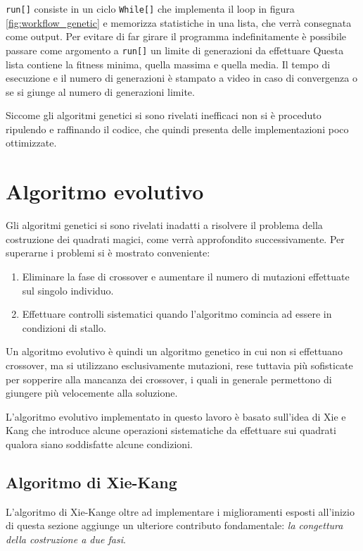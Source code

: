 \documentclass[italian,twoside,twocolumn]{article}
\begin{document}
\texttt{run[]} consiste in un ciclo \texttt{While[]} che implementa il loop in figura \ref{fig:workflow_genetic} e memorizza statistiche in una lista, che verrà consegnata come output. Per evitare di far girare il programma indefinitamente è possibile passare come argomento a \texttt{run[]} un limite di generazioni da effettuare Questa lista contiene la fitness minima, quella massima e quella media. Il tempo di esecuzione e il numero di generazioni è stampato a video in caso di convergenza o se si giunge al numero di generazioni limite. 

Siccome gli algoritmi genetici si sono rivelati inefficaci non si è proceduto ripulendo e raffinando il codice, che quindi presenta delle implementazioni poco ottimizzate.

\section{Algoritmo evolutivo}
Gli algoritmi genetici si sono rivelati inadatti a risolvere il problema della costruzione dei quadrati magici, come verrà approfondito successivamente. Per superarne i problemi si è mostrato conveniente:
\begin{enumerate}
	\item Eliminare la fase di crossover e aumentare il numero di mutazioni effettuate sul singolo individuo.
	\item Effettuare controlli sistematici quando l'algoritmo comincia ad essere in condizioni di stallo.
\end{enumerate}
Un algoritmo evolutivo è quindi un algoritmo genetico in cui non si effettuano crossover, ma si utilizzano esclusivamente mutazioni, rese tuttavia più sofisticate per sopperire alla mancanza dei crossover, i quali in generale permettono di giungere più velocemente alla soluzione. 

L'algoritmo evolutivo implementato in questo lavoro è basato sull'idea di Xie e Kang \cite{XieKang:2003} che introduce alcune operazioni sistematiche da effettuare sui quadrati qualora siano soddisfatte alcune condizioni.

\subsection{Algoritmo di Xie-Kang}

L'algoritmo di Xie-Kange oltre ad implementare i miglioramenti esposti all'inizio di questa sezione aggiunge un ulteriore contributo fondamentale: \emph{la congettura della costruzione a due fasi}. 
\end{document}
